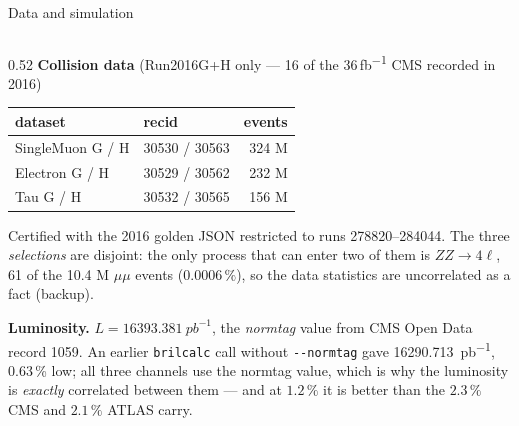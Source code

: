 \documentclass[aspectratio=169,9pt,t]{beamer}
\begin{document}
\begin{frame}{Data and simulation}
\begin{columns}[T]
\begin{column}{0.52\textwidth}\footnotesize
\textbf{Collision data} (Run2016G+H only --- 16 of the 36\,\si{fb^{-1}} CMS recorded in 2016)
\begin{center}\scriptsize
\begin{tabular}{@{}llr@{}}
\toprule
dataset & recid & events \\ \midrule
\textcolor{mumu}{SingleMuon} G / H & 30530 / 30563 & 324 M \\
\textcolor{ee}{Electron} G / H & 30529 / 30562 & 232 M \\
\textcolor{tautau}{Tau} G / H & 30532 / 30565 & 156 M \\
\bottomrule
\end{tabular}
\end{center}
Certified with the 2016 golden JSON restricted to runs 278820--284044. The three \emph{selections}
are disjoint: the only process that can enter two of them is $ZZ\to4\ell$, 61 of the 10.4 M
$\mu\mu$ events ($0.0006\,\%$), so the data statistics are uncorrelated as a fact (backup).

\medskip
\textbf{Luminosity.} $L = \SI{16393.381}{pb^{-1}}$, the \emph{normtag} value from CMS Open Data
record 1059. An earlier \texttt{brilcalc} call without \texttt{-{}-normtag} gave
\SI{16290.713}{pb^{-1}}, 0.63\,\% low; all three channels use the normtag value, which is why the
luminosity is \emph{exactly} correlated between them --- and at $1.2\,\%$ it is better than the
$2.3\,\%$ CMS and $2.1\,\%$ ATLAS carry.
\end{column}


\end{columns}
\end{frame}
\end{document}
